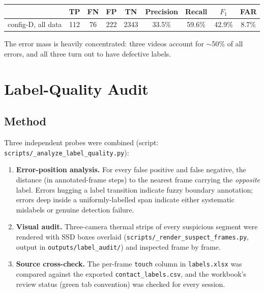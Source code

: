 \documentclass[11pt, a4paper]{article}
\begin{document}
\begin{center}
\begin{tabular}{lcccccccc}
\toprule
 & TP & FN & FP & TN & Precision & Recall & $F_1$ & FAR \\
\midrule
config-D, all data & 112 & 76 & 222 & 2343 & 33.5\% & 59.6\% & 42.9\% & 8.7\% \\
\bottomrule
\end{tabular}
\end{center}

The error mass is heavily concentrated: three videos account for
$\sim$50\% of all errors, and all three turn out to have defective labels.

\section{Label-Quality Audit}

\subsection{Method}

Three independent probes were combined
(script: \texttt{scripts/\_analyze\_label\_quality.py}):

\begin{enumerate}[itemsep=1pt]
    \item \textbf{Error-position analysis.} For every false positive and false negative,
    the distance (in annotated-frame steps) to the nearest frame carrying the
    \emph{opposite} label. Errors hugging a label transition indicate fuzzy boundary
    annotation; errors deep inside a uniformly-labelled span indicate either systematic
    mislabels or genuine detection failure.
    \item \textbf{Visual audit.} Three-camera thermal strips of every suspicious segment
    were rendered with SSD boxes overlaid
    (\texttt{scripts/\_render\_suspect\_frames.py}, output in
    \texttt{outputs/label\_audit/}) and inspected frame by frame.
    \item \textbf{Source cross-check.} The per-frame \texttt{touch} column in
    \texttt{labels.xlsx} was compared against the exported
    \texttt{contact\_labels.csv}, and the workbook's review status (green tab
    convention) was checked for every session.
\end{enumerate}
\end{document}
